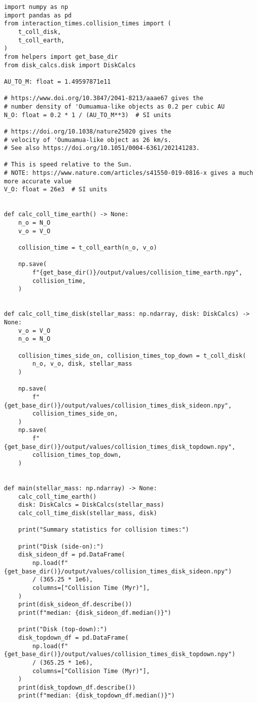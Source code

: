 \begin{lstlisting}
import numpy as np
import pandas as pd
from interaction_times.collision_times import (
    t_coll_disk,
    t_coll_earth,
)
from helpers import get_base_dir
from disk_calcs.disk import DiskCalcs

AU_TO_M: float = 1.49597871e11

# https://www.doi.org/10.3847/2041-8213/aaae67 gives the
# number density of 'Oumuamua-like objects as 0.2 per cubic AU
N_O: float = 0.2 * 1 / (AU_TO_M**3)  # SI units

# https://doi.org/10.1038/nature25020 gives the
# velocity of 'Oumuamua-like object as 26 km/s.
# See also https://doi.org/10.1051/0004-6361/202141283.

# This is speed relative to the Sun.
# NOTE: https://www.nature.com/articles/s41550-019-0816-x gives a much more accurate value
V_O: float = 26e3  # SI units


def calc_coll_time_earth() -> None:
    n_o = N_O
    v_o = V_O

    collision_time = t_coll_earth(n_o, v_o)

    np.save(
        f"{get_base_dir()}/output/values/collision_time_earth.npy",
        collision_time,
    )


def calc_coll_time_disk(stellar_mass: np.ndarray, disk: DiskCalcs) -> None:
    v_o = V_O
    n_o = N_O

    collision_times_side_on, collision_times_top_down = t_coll_disk(
        n_o, v_o, disk, stellar_mass
    )

    np.save(
        f"{get_base_dir()}/output/values/collision_times_disk_sideon.npy",
        collision_times_side_on,
    )
    np.save(
        f"{get_base_dir()}/output/values/collision_times_disk_topdown.npy",
        collision_times_top_down,
    )


def main(stellar_mass: np.ndarray) -> None:
    calc_coll_time_earth()
    disk: DiskCalcs = DiskCalcs(stellar_mass)
    calc_coll_time_disk(stellar_mass, disk)

    print("Summary statistics for collision times:")

    print("Disk (side-on):")
    disk_sideon_df = pd.DataFrame(
        np.load(f"{get_base_dir()}/output/values/collision_times_disk_sideon.npy")
        / (365.25 * 1e6),
        columns=["Collision Time (Myr)"],
    )
    print(disk_sideon_df.describe())
    print(f"median: {disk_sideon_df.median()}")

    print("Disk (top-down):")
    disk_topdown_df = pd.DataFrame(
        np.load(f"{get_base_dir()}/output/values/collision_times_disk_topdown.npy")
        / (365.25 * 1e6),
        columns=["Collision Time (Myr)"],
    )
    print(disk_topdown_df.describe())
    print(f"median: {disk_topdown_df.median()}")
\end{lstlisting}